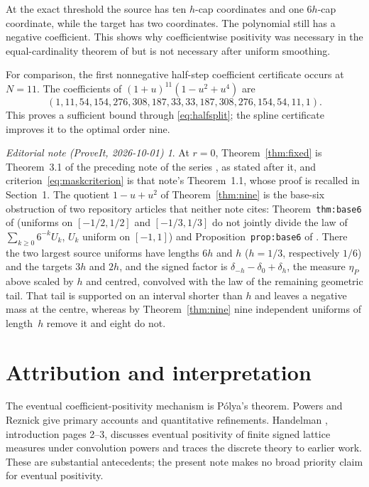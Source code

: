 \documentclass[11pt,a4paper]{article}
\theoremstyle{remark}\newtheorem*{ednote}{Editorial note (ProveIt, 2026-10-01)}
\begin{document}
At the exact threshold the source has ten $h$-cap coordinates and one $6h$-cap coordinate, while the target has two coordinates. The polynomial still has a negative coefficient. This shows why coefficientwise positivity was necessary in the equal-cardinality theorem of \cite{Masks} but is not necessary after uniform smoothing.

For comparison, the first nonnegative half-step coefficient certificate occurs at $N=11$. The coefficients of $(1+u)^{11}(1-u^2+u^4)$ are
\[
 (1,11,54,154,276,308,187,33,33,187,308,276,154,54,11,1).
\]
This proves a sufficient bound through \eqref{eq:halfsplit}; the spline certificate improves it to the optimal order nine.
\begin{ednote}
At $r=0$, Theorem~\ref{thm:fixed} is Theorem~3.1 of the preceding note of the
series \cite{Masks}, as stated after it, and
criterion~\eqref{eq:maskcriterion} is that note's Theorem~1.1, whose proof is
recalled in Section~1. The quotient $1-u+u^2$ of Theorem~\ref{thm:nine} is the
base-six obstruction of two repository articles that neither note cites:
Theorem~\texttt{thm:base6} of
(uniforms on $[-1/2,1/2]$ and $[-1/3,1/3]$ do not jointly divide the law of
$\sum_{k\ge0}6^{-k}U_k$, $U_k$ uniform on $[-1,1]$) and
Proposition~\texttt{prop:base6} of
.
There the two largest source uniforms have lengths $6h$ and $h$ ($h=1/3$,
respectively $1/6$) and the targets $3h$ and $2h$, and the signed factor is
$\delta_{-h}-\delta_0+\delta_h$, the measure $\eta_P$ above scaled by $h$ and
centred, convolved with the law of the remaining geometric tail. That tail is
supported on an interval shorter than $h$ and leaves a negative mass at the
centre, whereas by Theorem~\ref{thm:nine} nine independent uniforms of
length~$h$ remove it and eight do not.
\end{ednote}

\clearpage
\section{Attribution and interpretation}
The eventual coefficient-positivity mechanism is P\'olya's theorem. Powers and Reznick \cite{PowersReznick,Corners} give primary accounts and quantitative refinements. Handelman \cite{Handelman}, introduction pages 2--3, discusses eventual positivity of finite signed lattice measures under convolution powers and traces the discrete theory to earlier work. These are substantial antecedents; the present note makes no broad priority claim for eventual positivity.
\end{document}
